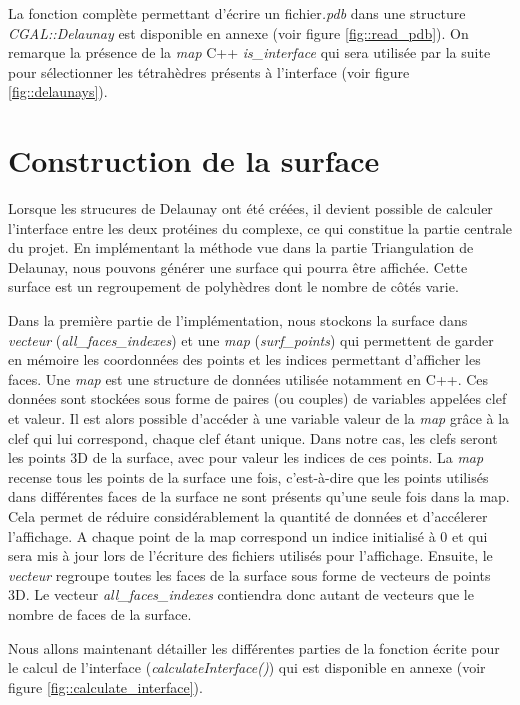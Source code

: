 La fonction complète permettant d'écrire un fichier\textit{.pdb} dans une structure
\textit{CGAL::Delaunay} est disponible en annexe (voir figure \ref{fig::read_pdb}).
On remarque la présence de la \textit{map} C++ \textit{is\_interface} qui sera utilisée par la suite
pour sélectionner les tétrahèdres présents à l'interface (voir figure \ref{fig::delaunays}).




\section{Construction de la surface}


Lorsque les strucures de Delaunay ont été créées, il devient possible de calculer l'interface
entre les deux protéines du complexe, ce qui constitue la partie centrale du projet.
En implémentant la méthode vue dans la partie Triangulation de Delaunay, nous pouvons générer
une surface qui pourra être affichée. Cette surface est un regroupement de polyhèdres
dont le nombre de côtés varie.



Dans la première partie de l'implémentation, nous stockons la surface dans \textit{vecteur}
(\textit{all\_faces\_indexes})
et une \textit{map} (\textit{surf\_points})
qui permettent de garder en mémoire les coordonnées des points
et les indices permettant d'afficher les faces. Une \textit{map} est une structure de données
utilisée notamment en C++. Ces données sont stockées sous forme de paires (ou couples)
de variables appelées clef et valeur. Il est alors possible d'accéder à une variable
valeur de la \textit{map} grâce à la clef qui lui correspond, chaque clef étant unique.
Dans notre cas, les clefs seront les points 3D de la surface, avec pour valeur les indices
de ces points.
La \textit{map}  recense tous les points
de la surface une fois, c'est-à-dire que les points utilisés dans différentes faces de la surface
ne sont présents qu'une seule fois dans la map. Cela permet de réduire considérablement
la quantité de données et d'accélerer l'affichage. A chaque point de la map correspond
un indice initialisé à 0 et qui sera mis à jour lors de l'écriture des fichiers utilisés
pour l'affichage. Ensuite, le \textit{vecteur} regroupe toutes les faces de la surface
sous forme de vecteurs de points 3D. Le vecteur \textit{all\_faces\_indexes} contiendra
donc autant de vecteurs que le nombre de faces de la surface.

Nous allons maintenant détailler les différentes parties de la fonction écrite pour
le calcul de l'interface (\textit{calculateInterface()}) qui est disponible en
annexe (voir figure \ref{fig::calculate_interface}).

